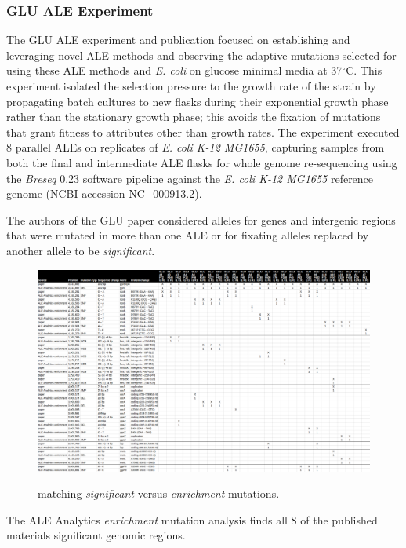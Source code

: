 \documentclass[12pt,final,masters,chapterheads]{ucsd}  %
\begin{document}
\subsubsection{GLU ALE Experiment}

The GLU ALE experiment and publication focused on establishing and leveraging novel ALE methods and observing the adaptive mutations selected for using these ALE methods and \textit{E. coli} on glucose minimal media at 37$^{\circ}$C. This experiment isolated the selection pressure to the growth rate of the strain by propagating batch cultures to new flasks during their exponential growth phase rather than the stationary growth phase; this avoids the fixation of mutations that grant fitness to attributes other than growth rates. The experiment executed 8 parallel ALEs on replicates of \textit{E. coli K-12 MG1655}, capturing samples from both the final and intermediate ALE flasks for whole genome re-sequencing using the \textit{Breseq} 0.23 software pipeline against the \textit{E. coli K-12 MG1655} reference genome (NCBI accession NC\_000913.2).

The authors of the GLU paper considered alleles for genes and intergenic regions that were mutated in more than one ALE or for fixating alleles replaced by another  allele to be \textit{significant}.

\begin{figure}[h!]
  \caption{matching \textit{significant} versus \textit{enrichment} mutations.}
  \centering
  \includegraphics[width=\textwidth]{GLU_matching_enrichment_muts.png}
  \label{fig:GLU_matching_enrichment_muts}
\end{figure}

The ALE Analytics \textit{enrichment} mutation analysis finds all 8 of the published materials significant genomic regions.
\end{document}
